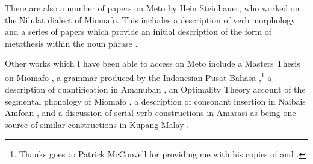 There are also a number of papers on Meto by Hein Steinhauer,
who worked on the Nilulat dialect of Miomafo.
This includes a description of verb morphology \citep{st93}
and a series of papers which provide an initial
description of the form of metathesis within the noun phrase
\citep{st96,st96b,st08}.

Other works which I have been able to access
on Meto include a Masters Thesis on Miomafo \citep{ta88},
a grammar produced by the Indonesian Pusat Bahasa \citep{ta89},\footnote{
		Thanks goes to Patrick McConvell for providing me
		with his copies of \citet{ta88} and \citet{ta89}.}
a description of quantification in Amanuban \citep{mebe14},
an Optimality Theory account of the segmental phonology of Miomafo \citep{is13},
a description of consonant insertion in Nai{\Q}bais Amfo{\Q}an \citep{cu18},
and a discussion of serial verb constructions in Amarasi
as being one source of similar constructions in Kupang Malay \citep{jagr11}.

